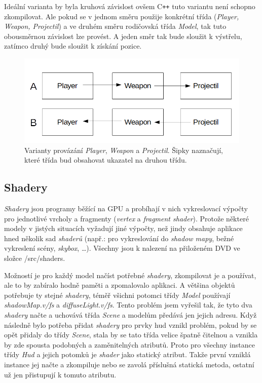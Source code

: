 Ideální varianta by byla kruhová závislost ovšem C\texttt{++} tuto variantu není schopno zkompilovat. Ale pokud se v jednom směru použije konkrétní třída (\emph{Player, Weapon, Projectil}) a ve druhém směru rodičovská třída \emph{Model}, tak tuto obousměrnou závislost lze provést. A jeden směr tak bude sloužit k výstřelu, zatímco druhý bude sloužit k získání pozice.
    \begin{figure}
	\begin{center}
		\includegraphics[scale = 0.6]{obrazky-figures/PWP}
		\caption{Varianty provázání \emph{Player}, \emph{Weapon} a \emph{Projectil}. Šipky naznačují, které třída bud obsahovat ukazatel na druhou třídu.}\label{PWPpicture}
\end{center}\end{figure}
\subsection{Shadery}
\emph{Shadery} jsou programy běžící na GPU a probíhají v nich vykreslovací výpočty pro jednotlivé vrcholy a fragmenty (\emph{vertex} a \emph{fragment shader}). Protože některé modely v jistých situacích vyžadují jiné výpočty, než jindy obsahuje aplikace hned několik sad \emph{shaderů} (např.: pro vykreslování do \emph{shadow mapy}, bežné vykreslení scény, \emph{skybox}, \dots). Všechny jsou k nalezení na přiloženém DVD ve složce /src/shaders. 

 Možností je pro každý model načíst potřebné \emph{shadery}, zkompilovat je a používat, ale to by zabíralo hodně paměti a zpomalovalo aplikaci. A většina objektů potřebuje ty stejné \emph{shadery}, téměř všichni potomci třídy \emph{Model} používají \emph{shadowMap.v/fs} a \emph{diffuseLight.v/fs}. Tento problém jsem vyřešil tak, že tyto dva \emph{shadery} načte a uchovává třída \emph{Scene} a modelům předává jen jejich adresu. Když následně bylo potřeba přidat \emph{shadery} pro prvky hud vznikl problém, pokud by se opět přidaly do třídy \emph{Scene}, stala by se tato třída velice špatně čitelnou a vznikla by zde spousta podobných a zaměnitelných atributů. Proto pro všechny instance třídy \emph{Hud} a jejich potomků je \emph{shader} jako statický atribut. Takže první vzniklá instance jej načte a zkompiluje nebo se zavolá příslušná statická metoda, ostatní už jen přistupují k tomuto atributu. 
 
